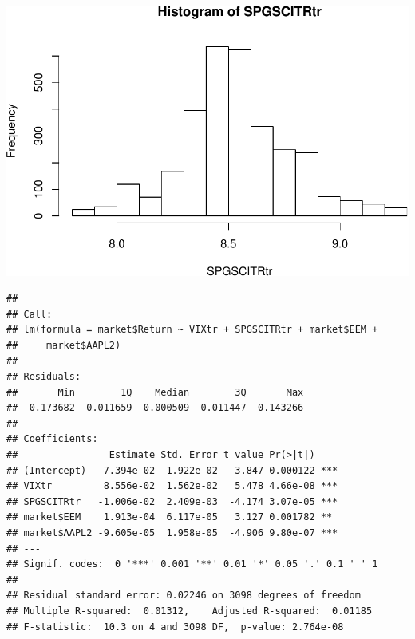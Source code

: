 \documentclass[]{article}
\newenvironment{Shaded}{\begin{snugshade}}{\end{snugshade}}
\newcommand{\KeywordTok}[1]{\textcolor[rgb]{0.13,0.29,0.53}{\textbf{#1}}}
\newcommand{\StringTok}[1]{\textcolor[rgb]{0.31,0.60,0.02}{#1}}
\newcommand{\OperatorTok}[1]{\textcolor[rgb]{0.81,0.36,0.00}{\textbf{#1}}}
\newcommand{\NormalTok}[1]{#1}
\begin{document}
\includegraphics{report_files/figure-latex/unnamed-chunk-16-2.pdf}

\begin{Shaded}
\end{Shaded}

\begin{verbatim}
## 
## Call:
## lm(formula = market$Return ~ VIXtr + SPGSCITRtr + market$EEM + 
##     market$AAPL2)
## 
## Residuals:
##       Min        1Q    Median        3Q       Max 
## -0.173682 -0.011659 -0.000509  0.011447  0.143266 
## 
## Coefficients:
##                Estimate Std. Error t value Pr(>|t|)    
## (Intercept)   7.394e-02  1.922e-02   3.847 0.000122 ***
## VIXtr         8.556e-02  1.562e-02   5.478 4.66e-08 ***
## SPGSCITRtr   -1.006e-02  2.409e-03  -4.174 3.07e-05 ***
## market$EEM    1.913e-04  6.117e-05   3.127 0.001782 ** 
## market$AAPL2 -9.605e-05  1.958e-05  -4.906 9.80e-07 ***
## ---
## Signif. codes:  0 '***' 0.001 '**' 0.01 '*' 0.05 '.' 0.1 ' ' 1
## 
## Residual standard error: 0.02246 on 3098 degrees of freedom
## Multiple R-squared:  0.01312,    Adjusted R-squared:  0.01185 
## F-statistic:  10.3 on 4 and 3098 DF,  p-value: 2.764e-08
\end{verbatim}
\end{document}
